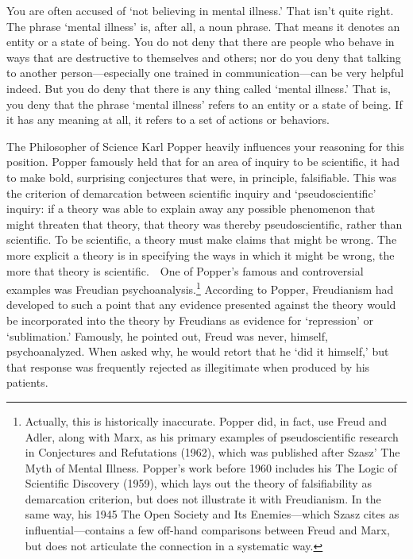 \begin{refsection}
You are often accused of `not believing in mental illness.' That isn't quite right. The phrase `mental illness' is, after all, a noun phrase. That means it denotes an entity or a state of being. You do not deny that there are people who behave in ways that are destructive to themselves and others; nor do you deny that talking to another person---especially one trained in communication---can be very helpful indeed. But you do deny that there is any thing called `mental illness.' That is, you deny that the phrase `mental illness' refers to an entity or a state of being. If it has any meaning at all, it refers to a set of actions or behaviors.

The Philosopher of Science Karl Popper heavily influences your reasoning for this position. Popper famously held that for an area of inquiry to be scientific, it had to make bold, surprising conjectures that were, in principle, falsifiable. This was the criterion of demarcation between scientific inquiry and `pseudoscientific' inquiry: if a theory was able to explain away any possible phenomenon that might threaten that theory, that theory was thereby pseudoscientific, rather than scientific. To be scientific, a theory must make claims that might be wrong. The more explicit a theory is in specifying the ways in which it might be wrong, the more that theory is scientific.
  One of Popper's famous and controversial examples was Freudian psychoanalysis.\footnote{Actually, this is historically inaccurate. Popper did, in fact, use Freud and Adler, along with Marx, as his primary examples of pseudoscientific research in Conjectures and Refutations (1962), which was published after Szasz' The Myth of Mental Illness. Popper's work before 1960 includes his The Logic of Scientific Discovery (1959), which lays out the theory of falsifiability as demarcation criterion, but does not illustrate it with Freudianism. In the same way, his 1945 The Open Society and Its Enemies---which Szasz cites as influential---contains a few off-hand comparisons between Freud and Marx, but does not articulate the connection in a systematic way.} According to Popper, Freudianism had developed to such a point that any evidence presented against the theory would be incorporated into the theory by Freudians as evidence for `repression' or `sublimation.' Famously, he pointed out, Freud was never, himself, psychoanalyzed. When asked why, he would retort that he `did it himself,' but that response was frequently rejected as illegitimate when produced by his patients.


\end{refsection}
